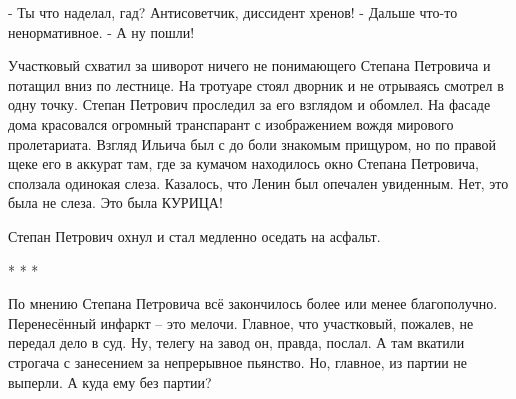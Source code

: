 - Ты что наделал, гад? Антисоветчик, диссидент хренов! - Дальше что-то
ненормативное. - А ну пошли!

Участковый схватил за шиворот ничего не понимающего Степана Петровича и потащил
вниз по лестнице. На тротуаре стоял дворник и не отрываясь смотрел в одну
точку. Степан Петрович проследил за его взглядом и обомлел. На фасаде дома
красовался огромный транспарант с изображением вождя мирового пролетариата.
Взгляд Ильича был с до боли знакомым прищуром, но по правой щеке его в аккурат
там, где за кумачом находилось окно Степана Петровича, сползала одинокая слеза.
Казалось, что Ленин был опечален увиденным. Нет, это была не слеза. Это была
КУРИЦА!

Степан Петрович охнул и стал медленно оседать на асфальт.

* * *

По мнению Степана Петровича всё закончилось более или менее благополучно.
Перенесённый инфаркт – это мелочи. Главное, что участковый, пожалев, не передал
дело в суд. Ну, телегу на завод он, правда, послал. А там вкатили строгача с
занесением за непрерывное пьянство. Но, главное, из партии не выперли. А куда
ему без партии?
